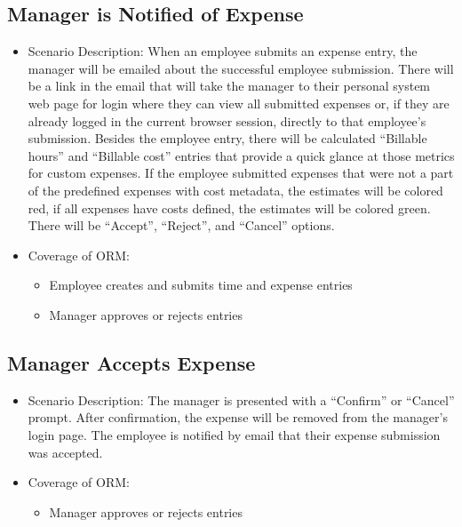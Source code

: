 \documentclass[12pt]{article}
\begin{document}
\subsection{ Manager is Notified of Expense}
\begin{itemize}
\item Scenario Description: When an employee submits an expense entry, the manager will be emailed about  the successful employee submission. There will be a link in the email that will take the manager to their personal system web page for login where they can view all submitted expenses or, if they are already logged in the current browser session, directly to that employee’s submission. Besides the employee entry, there will be calculated “Billable hours” and “Billable cost” entries that provide a quick glance at those metrics for custom expenses. If the employee submitted expenses that were not a part of the predefined expenses with cost metadata, the estimates will be colored red, if all expenses have costs defined, the estimates will be colored green. There will be “Accept”, “Reject”, and “Cancel” options.
\item Coverage of ORM:
\begin{itemize}
\item Employee creates and submits time and expense entries
\item Manager approves or rejects entries
\end{itemize}
\end{itemize}

\subsection{ Manager Accepts Expense}
\begin{itemize}
\item Scenario Description: The manager is presented with a “Confirm” or “Cancel” prompt. After confirmation, the expense will be removed from the manager’s login page. The employee is notified by email that their expense submission was accepted.
\item Coverage of ORM:
\begin{itemize}
\item Manager approves or rejects entries
\end{itemize}
\end{itemize}
\end{document}
